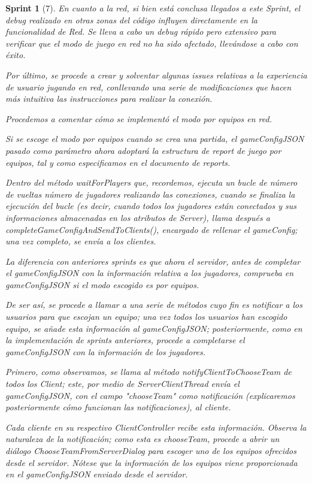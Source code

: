 \documentclass[12pt,a4paper,openright]{book}
\theoremstyle{break}
\newtheorem*{sprint}{Sprint}
\begin{document}
\begin{sprint}[7]

En cuanto a la red, si bien está conclusa llegados a este Sprint, el debug realizado en otras zonas del código influyen directamente en la funcionalidad de Red. Se lleva a cabo un debug rápido pero extensivo para verificar que el modo de juego en red no ha sido afectado, llevándose a cabo con éxito.

Por último, se procede a crear y solventar algunas issues relativas a la experiencia de usuario jugando en red, conllevando una serie de modificaciones que hacen más intuitiva las instrucciones para realizar la conexión.

Procedemos a comentar cómo se implementó el modo por equipos en red.

Si se escoge el modo por equipos cuando se crea una partida, el gameConfigJSON pasado como parámetro ahora adoptará la estructura de report de juego por equipos, tal y como especificamos en el documento de reports.

Dentro del método waitForPlayers que, recordemos, ejecuta un bucle de número de vueltas número de jugadores realizando las conexiones, cuando se finaliza la ejecución del bucle (es decir, cuando todos los jugadores están conectados y sus informaciones almacenadas en los atributos de Server), llama después a completeGameConfigAndSendToClients(), encargado de rellenar el gameConfig; una vez completo, se envía a los clientes.

La diferencia con anteriores sprints es que ahora el servidor, antes de completar el gameConfigJSON con la información relativa a los jugadores, comprueba en gameConfigJSON si el modo escogido es por equipos.

De ser así, se procede a llamar a una serie de métodos cuyo fin es notificar a los usuarios para que escojan un equipo; una vez todos los usuarios han escogido equipo, se añade esta información al gameConfigJSON; posteriormente, como en la implementación de sprints anteriores, procede a completarse el gameConfigJSON con la información de los jugadores.

Primero, como observamos, se llama al método notifyClientToChooseTeam de todos los Client; este, por medio de ServerClientThread envía el gameConfigJSON, con el campo "chooseTeam" como notificación (explicaremos posteriormente cómo funcionan las notificaciones), al cliente.

Cada cliente en su respectivo ClientController recibe esta información. Observa la naturaleza de la notificación; como esta es chooseTeam, procede a abrir un diálogo ChooseTeamFromServerDialog para escoger uno de los equipos ofrecidos desde el servidor. Nótese que la información de los equipos viene proporcionada en el gameConfigJSON enviado desde el servidor.


\end{sprint}
\end{document}
